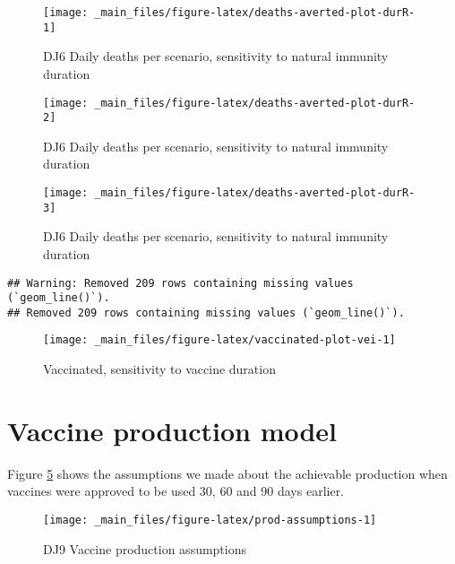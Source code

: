 \documentclass{article}
\begin{document}
\begin{figure}

{\centering \texttt{[image: \_main\_files/figure-latex/deaths-averted-plot-durR-1]} 

}

\caption{DJ6 Daily deaths per scenario, sensitivity to natural immunity duration}\label{fig:deaths-averted-plot-durR-1}
\end{figure}
\begin{figure}

{\centering \texttt{[image: \_main\_files/figure-latex/deaths-averted-plot-durR-2]} 

}

\caption{DJ6 Daily deaths per scenario, sensitivity to natural immunity duration}\label{fig:deaths-averted-plot-durR-2}
\end{figure}
\begin{figure}

{\centering \texttt{[image: \_main\_files/figure-latex/deaths-averted-plot-durR-3]} 

}

\caption{DJ6 Daily deaths per scenario, sensitivity to natural immunity duration}\label{fig:deaths-averted-plot-durR-3}
\end{figure}

\begin{verbatim}
## Warning: Removed 209 rows containing missing values (`geom_line()`).
## Removed 209 rows containing missing values (`geom_line()`).
\end{verbatim}

\begin{figure}

{\centering \texttt{[image: \_main\_files/figure-latex/vaccinated-plot-vei-1]} 

}

\caption{Vaccinated, sensitivity to vaccine duration}\label{fig:vaccinated-plot-vei}
\end{figure}

\hypertarget{vaccine-production-model}{%
\section{Vaccine production model}\label{vaccine-production-model}}

Figure \ref{fig:prod-assumptions} shows the assumptions we made about the achievable production when vaccines were approved to be used 30, 60 and 90 days earlier.

\begin{figure}

{\centering \texttt{[image: \_main\_files/figure-latex/prod-assumptions-1]} 

}

\caption{DJ9 Vaccine production assumptions}\label{fig:prod-assumptions}
\end{figure}
\end{document}

